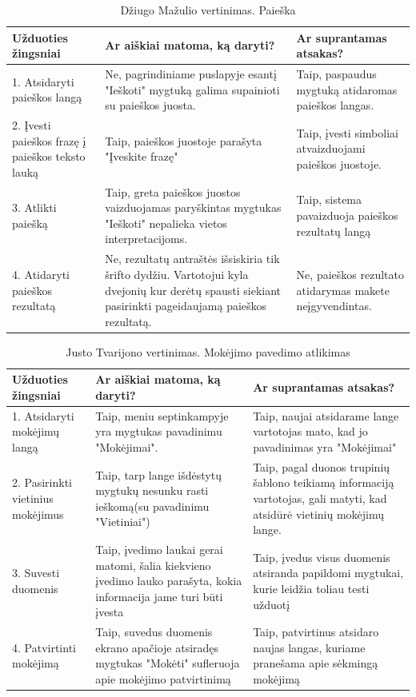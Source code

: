 \documentclass[oneside]{VUMIFPSkursinis}
\begin{document}
\begin{center}
\begin{longtable}[!htb]{|p{5cm}|p{5cm}|p{5cm}|}
	\caption{Džiugo Mažulio vertinimas. Paieška}
\endfirsthead
\endhead
	\hline
	Užduoties žingsniai & Ar aiškiai matoma, ką daryti? & Ar suprantamas atsakas? \\ \hline
	1. Atsidaryti paieškos langą & Ne, pagrindiniame puslapyje esantį "Ieškoti" mygtuką galima supainioti su paieškos juosta. & Taip, paspaudus mygtuką atidaromas paieškos langas. \\ \hline
	2. Įvesti paieškos frazę į paieškos teksto lauką & Taip, paieškos juostoje parašyta "Įveskite frazę" & Taip, įvesti simboliai atvaizduojami paieškos juostoje. \\ \hline
	3. Atlikti paiešką & Taip, greta paieškos juostos vaizduojamas paryškintas mygtukas "Ieškoti" nepalieka vietos interpretacijoms. & Taip, sistema pavaizduoja paieškos rezultatų langą \\ \hline
	4. Atidaryti paieškos rezultatą & Ne, rezultatų antraštės išsiskiria tik šrifto dydžiu. Vartotojui kyla dvejonių kur derėtų spausti siekiant pasirinkti pageidaujamą paieškos rezultatą. & Ne, paieškos rezultato atidarymas makete neįgyvendintas. \\ \hline
\end{longtable}
\end{center}
\begin{center}
\begin{longtable}[!htb]{|p{5cm}|p{5cm}|p{5cm}|}
	\caption{Justo Tvarijono vertinimas. Mokėjimo pavedimo atlikimas}
\endfirsthead
\endhead
	\hline
	Užduoties žingsniai & Ar aiškiai matoma, ką daryti? & Ar suprantamas atsakas? \\ \hline
	1. Atsidaryti mokėjimų langą & Taip, meniu septinkampyje yra mygtukas pavadinimu "Mokėjimai".  & Taip, naujai atsidarame lange vartotojas mato, kad jo pavadinimas yra "Mokėjimai"  \\ \hline
	2. Pasirinkti vietinius mokėjimus & Taip, tarp lange išdėstytų mygtukų nesunku rasti ieškomą(su pavadinimu "Vietiniai") & Taip, pagal duonos trupinių šablono teikiamą informaciją vartotojas, gali matyti, kad atsidūrė vietinių mokėjimų lange. \\ \hline
	3. Suvesti duomenis & Taip, įvedimo laukai gerai matomi, šalia kiekvieno įvedimo lauko parašyta, kokia informacija jame turi būti įvesta & Taip, įvedus visus duomenis atsiranda papildomi mygtukai, kurie leidžia toliau testi užduotį \\ \hline
	4. Patvirtinti mokėjimą & Taip, suvedus duomenis ekrano apačioje atsiradęs mygtukas "Mokėti" sufleruoja apie mokėjimo patvirtinimą & Taip, patvirtinus atsidaro naujas langas, kuriame pranešama apie sėkmingą mokėjimą \\ \hline
\end{longtable}
\end{center}
\end{document}
